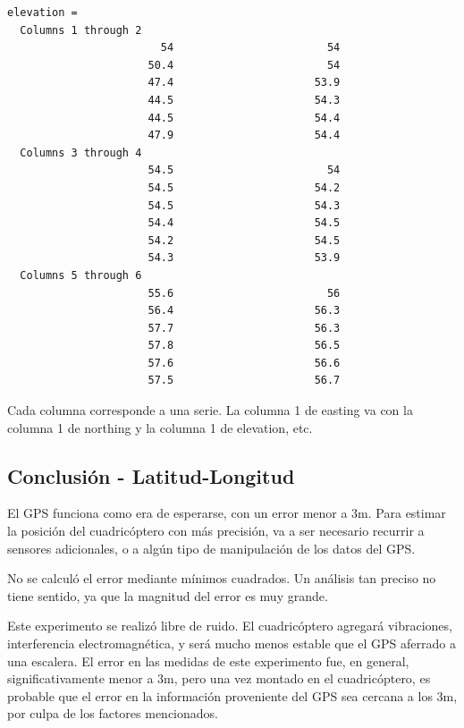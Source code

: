 \documentclass[spanish,12pt,a4paper,titlepage]{report}
\begin{document}
\newpage
\begin{verbatim}
elevation =
  Columns 1 through 2
                        54                        54
                      50.4                        54
                      47.4                      53.9
                      44.5                      54.3
                      44.5                      54.4
                      47.9                      54.4
  Columns 3 through 4
                      54.5                        54
                      54.5                      54.2
                      54.5                      54.3
                      54.4                      54.5
                      54.2                      54.5
                      54.3                      53.9
  Columns 5 through 6
                      55.6                        56
                      56.4                      56.3
                      57.7                      56.3
                      57.8                      56.5
                      57.6                      56.6
                      57.5                      56.7
\end{verbatim}

 Cada columna corresponde a una serie. La columna 1 de easting va con la columna 1 de northing y la columna 1 de elevation, etc.

\subsection{Conclusión - Latitud-Longitud}
\label{sec:error-lat-lon-conclusion}

El GPS funciona como era de esperarse, con un error menor a 3m. Para estimar la posición del cuadricóptero con más precisión, va a ser necesario recurrir a sensores adicionales, o a algún tipo de manipulación de los datos del GPS.

No se calculó el error mediante mínimos cuadrados. Un análisis tan preciso no tiene sentido, ya que la magnitud del error es muy grande.

Este experimento se realizó libre de ruido. El cuadricóptero agregará vibraciones, interferencia electromagnética, y será mucho menos estable que el GPS aferrado a una escalera. El error en las medidas de este experimento fue, en general, significativamente menor a 3m, pero una vez montado en el cuadricóptero, es probable que el error en la información proveniente del GPS sea cercana a los 3m, por culpa de los factores mencionados.
\end{document}
